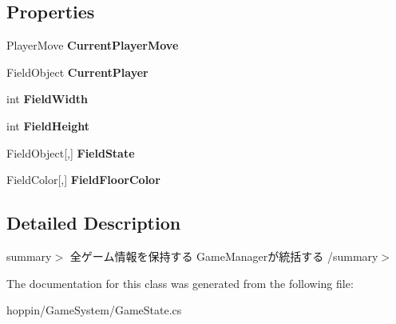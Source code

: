 \subsection*{Properties}
\begin{DoxyCompactItemize}
\item 
Player\+Move {\bfseries Current\+Player\+Move}\hypertarget{classhoppin_1_1_game_system_1_1_game_state_ada3834c6d2c1ccdc3bde5576a441a230}{}\label{classhoppin_1_1_game_system_1_1_game_state_ada3834c6d2c1ccdc3bde5576a441a230}

\item 
Field\+Object {\bfseries Current\+Player}\hypertarget{classhoppin_1_1_game_system_1_1_game_state_a556b34d4e6bbaeaadee64a2b37297039}{}\label{classhoppin_1_1_game_system_1_1_game_state_a556b34d4e6bbaeaadee64a2b37297039}

\item 
int {\bfseries Field\+Width}\hypertarget{classhoppin_1_1_game_system_1_1_game_state_af1d1a8a6d4cb794cf0b4314f12720d96}{}\label{classhoppin_1_1_game_system_1_1_game_state_af1d1a8a6d4cb794cf0b4314f12720d96}

\item 
int {\bfseries Field\+Height}\hypertarget{classhoppin_1_1_game_system_1_1_game_state_aa6acc094597adc0350a25824b7a9d105}{}\label{classhoppin_1_1_game_system_1_1_game_state_aa6acc094597adc0350a25824b7a9d105}

\item 
Field\+Object\mbox{[},\mbox{]} {\bfseries Field\+State}\hypertarget{classhoppin_1_1_game_system_1_1_game_state_a2a28e86ec245b55fb6120055e5299cd7}{}\label{classhoppin_1_1_game_system_1_1_game_state_a2a28e86ec245b55fb6120055e5299cd7}

\item 
Field\+Color\mbox{[},\mbox{]} {\bfseries Field\+Floor\+Color}\hypertarget{classhoppin_1_1_game_system_1_1_game_state_a19d393158ce2eb52290730c2672fa68d}{}\label{classhoppin_1_1_game_system_1_1_game_state_a19d393158ce2eb52290730c2672fa68d}

\end{DoxyCompactItemize}


\subsection{Detailed Description}
summary$>$ 全ゲーム情報を保持する Game\+Managerが統括する /summary$>$ 

The documentation for this class was generated from the following file\+:\begin{DoxyCompactItemize}
\item 
hoppin/\+Game\+System/Game\+State.\+cs\end{DoxyCompactItemize}
